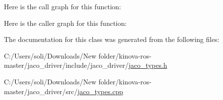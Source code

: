 Here is the call graph for this function\+:




Here is the caller graph for this function\+:




The documentation for this class was generated from the following files\+:\begin{DoxyCompactItemize}
\item 
C\+:/\+Users/soli/\+Downloads/\+New folder/kinova-\/ros-\/master/jaco\+\_\+driver/include/jaco\+\_\+driver/\hyperlink{jaco__types_8h}{jaco\+\_\+types.\+h}\item 
C\+:/\+Users/soli/\+Downloads/\+New folder/kinova-\/ros-\/master/jaco\+\_\+driver/src/\hyperlink{jaco__types_8cpp}{jaco\+\_\+types.\+cpp}\end{DoxyCompactItemize}
